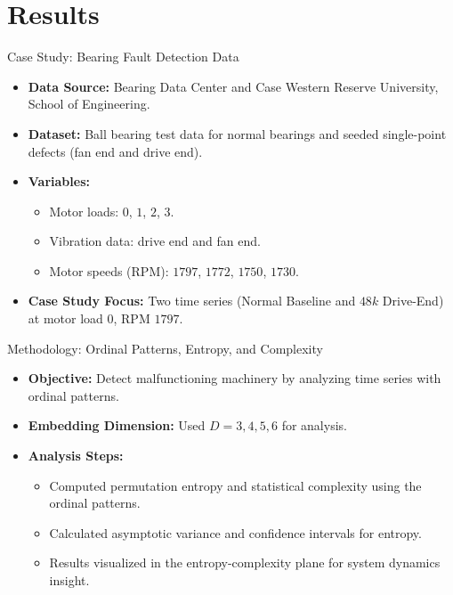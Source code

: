 \documentclass{beamer}
\begin{document}
\section{Results}
\begin{frame}{Case Study: Bearing Fault Detection Data}
	\begin{itemize}
		\item \textbf{Data Source:} Bearing Data Center and Case Western Reserve University, School of Engineering.
		\item \textbf{Dataset:} Ball bearing test data for normal bearings and seeded single-point defects (fan end and drive end).
		\item \textbf{Variables:}
		\begin{itemize}
			\item Motor loads: $0$, $1$, $2$, $3$.
			\item Vibration data: drive end and fan end.
			\item Motor speeds (RPM): $1797$, $1772$, $1750$, $1730$.
		\end{itemize}
		\item \textbf{Case Study Focus:} Two time series (Normal Baseline and $48k$ Drive-End) at motor load $0$, RPM $1797$.
	\end{itemize}
\end{frame}

\begin{frame}{Methodology: Ordinal Patterns, Entropy, and Complexity}
	\begin{itemize}
		\item \textbf{Objective:} Detect malfunctioning machinery by analyzing time series with ordinal patterns.
		\item \textbf{Embedding Dimension:} Used $D = 3, 4, 5, 6$ for analysis.
		\item \textbf{Analysis Steps:}
		\begin{itemize}
			\item Computed permutation entropy and statistical complexity using the ordinal patterns.
			\item Calculated asymptotic variance and confidence intervals for entropy.
			\item Results visualized in the entropy-complexity plane for system dynamics insight.
		\end{itemize}
	\end{itemize}
\end{frame}
\end{document}
